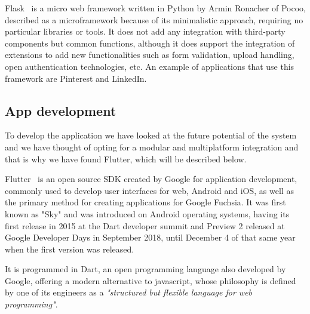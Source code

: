 Flask~\cite{Welcomet8:online} is a micro web framework written in Python by Armin Ronacher of Pocoo, described as a microframework because of its minimalistic approach, requiring no particular libraries or tools. It does not add any integration with third-party components but common functions, although it does support the integration of extensions to add new functionalities such as form validation, upload handling, open authentication technologies, etc. An example of applications that use this framework are Pinterest and LinkedIn.


\subsection{App development}
To develop the application we have looked at the future potential of the system and we have thought of opting for a modular and multiplatform integration and that is why we have found Flutter, which will be described below.

Flutter~\cite{FlutterB22:online} is an open source SDK created by Google for application development, commonly used to develop user interfaces for web, Android and iOS, as well as the primary method for creating applications for Google Fuchsia. It was first known as "Sky" and was introduced on Android operating systems, having its first release in 2015 at the Dart developer summit and Preview 2 released at Google Developer Days in September 2018, until December 4 of that same year when the first version was released.

It is programmed in Dart, an open programming language also developed by Google, offering a modern alternative to javascript, whose philosophy is defined by one of its engineers as a \textit{"structured but flexible language for web programming"}.



